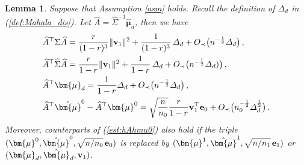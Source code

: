 \documentclass[12pt]{article}
\numberwithin{equation}{section}
\newtheorem{lem}{Lemma}
\theoremstyle{remark}
\newcommand{\1}{{\rm 1}\kern-0.24em{\rm I}}
\begin{document}
\begin{lem}\label{lem:ests}
Suppose that Assumption \ref{asm} holds. Recall the definition of $\varDelta_d$ in (\ref{def:Mahala_dis}). Let $\widehat A = \widehat \Sigma^{-1}\hat {\bm{\mu}}_d$, then we have 
\begin{align}
&\widehat{A} ^{\top} \Sigma \widehat{A} =   \frac{r}{(1-r)^3}\Vert {\bf v}_1\Vert^2 + \frac{1}{(1-r)^3} \,\varDelta_d + O_\prec \big(n^{-\frac 12}\varDelta_d \big)\,,\label{est:hAShA}\\
&\widehat{A} ^{\top} \widehat\Sigma \widehat{A} =   \frac{r}{1-r} \Vert {\bf v}_1\Vert^2 +  \frac{1}{1-r} \, \varDelta_d  +O_\prec \big(n^{-\frac 12}\varDelta_d )  \big)\,, \label{est:hAhShA} \\
& \widehat{A}^{\top}  {\bm{\mu}}_d  = \frac{1}{1- r}  \varDelta_d  + O_{\prec} \big(n^{-\frac 12} \varDelta_d\big)\, ,  \label{est:hAmu0} \\
& \widehat{A} ^{\top} \hat{\bm{\mu}}^0 - \widehat{A} ^{\top}  {\bm{\mu}}^0 = \sqrt{\frac{n}{n_0}} \frac{r}{1-r} {\bf v}_1^{\top} {\bf e}_0 + O_\prec \big( n_0^{-\frac 12} \varDelta_d^{\frac 12}\big)\, .   \label{est:hAhmu0}
\end{align}
%
Moreover, counterparts of  (\ref{est:hAhmu0}) also hold  if the triple $({\bm{\mu}}^0, \hat{{\bm{\mu}}}^0, \sqrt{n/n_0} \, {\bf e}_0)$ is replaced by $({\bm{\mu}}^1, \hat{{\bm{\mu}}}^1, \sqrt{n/n_1} \, {\bf e}_1)$ or $({\bm{\mu}}_d, \hat{{\bm{\mu}}}_d , {\bf v}_1)$.
\end{lem}


\end{document}
